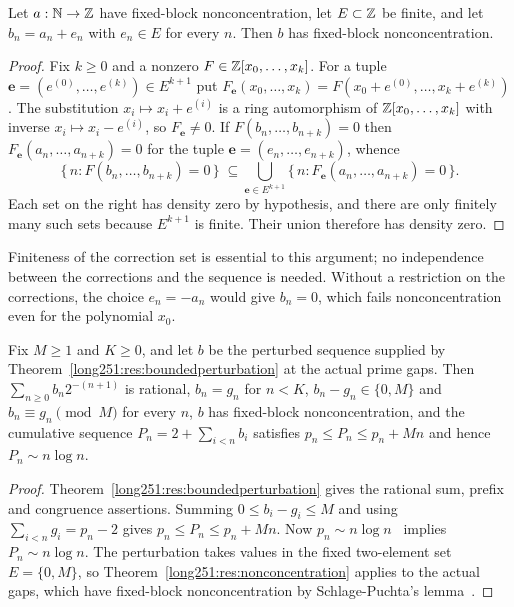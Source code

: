 \documentclass[11pt]{article}
\begin{document}
\begin{theorem}\label{long251:res:nonconcentration}
Let $a:\mathbb{N}\to\mathbb{Z}$ have fixed-block nonconcentration, let $E\subset\mathbb{Z}$ be finite,
and let $b_n=a_n+e_n$ with $e_n\in E$ for every $n$.  Then $b$ has fixed-block
nonconcentration.
\end{theorem}

\begin{proof}
Fix $k\ge0$ and a nonzero $F\in\mathbb{Z}[x_0,\ldots,x_k]$.  For a tuple
$\mathbf e=(e^{(0)},\ldots,e^{(k)})\in E^{k+1}$ put
$F_{\mathbf e}(x_0,\ldots,x_k)=F(x_0+e^{(0)},\ldots,x_k+e^{(k)})$.  The
substitution $x_i\mapsto x_i+e^{(i)}$ is a ring automorphism of
$\mathbb{Z}[x_0,\ldots,x_k]$ with inverse $x_i\mapsto x_i-e^{(i)}$, so
$F_{\mathbf e}\ne0$.  If $F(b_n,\ldots,b_{n+k})=0$ then
$F_{\mathbf e}(a_n,\ldots,a_{n+k})=0$ for the tuple
$\mathbf e=(e_n,\ldots,e_{n+k})$, whence
\[
 \{\,n:F(b_n,\ldots,b_{n+k})=0\,\}
 \;\subseteq\!\!
 \bigcup_{\mathbf e\in E^{k+1}}\!\!
 \{\,n:F_{\mathbf e}(a_n,\ldots,a_{n+k})=0\,\}.
\]
Each set on the right has density zero by hypothesis, and there are
only finitely many such sets because $E^{k+1}$ is finite.  Their union
therefore has density zero.
\end{proof}

Finiteness of the correction set is essential to this argument; no
independence between the corrections and the sequence is needed.
Without a restriction on the corrections, the choice $e_n=-a_n$ would
give $b_n=0$, which fails nonconcentration even for the polynomial $x_0$.

\begin{corollary}\label{long251:res:nonconc-primes}
Fix $M\ge1$ and $K\ge0$, and let $b$ be the perturbed sequence supplied by
Theorem~\ref{long251:res:boundedperturbation} at the actual prime gaps.  Then
$\sum_{n\ge0}b_n2^{-(n+1)}$ is rational, $b_n=g_n$ for $n<K$,
$b_n-g_n\in\{0,M\}$ and $b_n\equiv g_n\pmod M$ for every $n$, $b$ has
fixed-block nonconcentration, and the cumulative sequence
$P_n=2+\sum_{i<n}b_i$ satisfies $p_n\le P_n\le p_n+Mn$ and hence
$P_n\sim n\log n$.
\end{corollary}


\begin{proof}
Theorem~\ref{long251:res:boundedperturbation} gives the rational sum,
prefix and congruence assertions.  Summing $0\le b_i-g_i\le M$ and using
$\sum_{i<n}g_i=p_n-2$ gives $p_n\le P_n\le p_n+Mn$.
Now $p_n\sim n\log n$~\cite[Chapter~6]{mv2007} implies $P_n\sim n\log n$.
The perturbation takes values in
the fixed two-element set $E=\{0,M\}$, so
Theorem~\ref{long251:res:nonconcentration} applies to the actual gaps, which
have fixed-block nonconcentration by Schlage-Puchta's
lemma~\cite[Lemma~4]{schlagepuchta2011}.
\end{proof}
\end{document}
